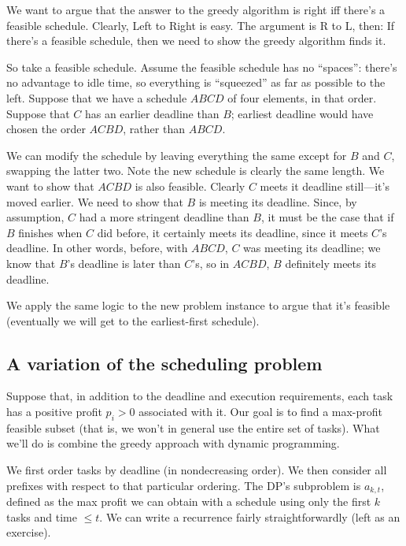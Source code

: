 \documentclass{article}
\begin{document}
We want to argue that the answer to the greedy algorithm is right iff there's
a feasible schedule.
Clearly, Left to Right is easy.
The argument is R to L, then: If there's a feasible schedule, then we need
to show the greedy algorithm finds it.

So take a feasible schedule.
Assume the feasible schedule has no ``spaces'': there's no advantage
to idle time, so everything is ``squeezed'' as far as possible to the left.
Suppose that we have a schedule $ABCD$ of four elements, in that order.
Suppose that $C$ has an earlier deadline than $B$; earliest deadline
would have chosen the order $ACBD$, rather than $ABCD$.

We can modify the schedule by leaving everything the same except for 
$B$ and $C$, swapping the latter two.
Note the new schedule is clearly the same length.
We want to show that $ACBD$ is also feasible.
Clearly $C$ meets it deadline still---it's moved earlier.
We need to show that $B$ is meeting its deadline.
Since, by assumption, $C$ had a more stringent deadline than $B$, it must
be the case that if $B$ finishes when $C$ did before, it certainly meets
its deadline, since it meets $C$'s deadline.
In other words, before, with $ABCD$, $C$ was meeting its deadline; we know that 
$B$'s deadline is later than $C$'s, so in $ACBD$, $B$ definitely meets its deadline.

We apply the same logic to the new problem instance to argue that it's feasible 
(eventually we will get to the earliest-first schedule).




\subsection{A variation of the scheduling problem}

Suppose that, in addition to the deadline and execution requirements,
each task has a positive profit $p_i > 0$ associated with it.
Our goal is to find a max-profit feasible subset (that is, we won't in general
use the entire set of tasks).
What we'll do is combine the greedy approach with dynamic programming.

We first order tasks by deadline (in nondecreasing order).
We then consider all prefixes with respect to that particular ordering.
The DP's subproblem is $a_{k,t}$, defined as the max profit we can
obtain with a schedule using only the first $k$ tasks and time $\leq t$.
We can write a recurrence fairly straightforwardly (left as an exercise).
\end{document}
